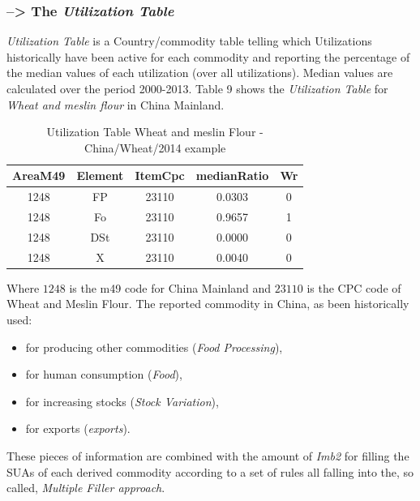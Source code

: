 \documentclass[]{article}
\providecommand{\tightlist}{%
  \setlength{\itemsep}{0pt}\setlength{\parskip}{0pt}}
\begin{document}
\subsubsection*{\texorpdfstring{--\textgreater{} The \emph{Utilization
Table}}{--\textgreater{} The Utilization Table}}\label{the-utilization-table}

\emph{Utilization Table} is a Country/commodity table telling which
Utilizations historically have been active for each commodity and
reporting the percentage of the median values of each utilization (over
all utilizations). Median values are calculated over the period
2000-2013. Table 9 shows the \emph{Utilization Table} for \emph{Wheat
and meslin flour} in China Mainland.

\begin{table}

\caption{\label{tab:t8}Utilization Table Wheat and meslin Flour - China/Wheat/2014 example}
\centering
\begin{tabular}[t]{c|c|c|c|c}
\hline
AreaM49 & Element & ItemCpc & medianRatio & Wr\\
\hline
1248 & FP & 23110 & 0.0303 & 0\\
\hline
1248 & Fo & 23110 & 0.9657 & 1\\
\hline
1248 & DSt & 23110 & 0.0000 & 0\\
\hline
1248 & X & 23110 & 0.0040 & 0\\
\hline
\end{tabular}
\end{table}

Where \(1248\) is the m49 code for China Mainland and \(23110\) is the
CPC code of Wheat and Meslin Flour. The reported commodity in China, as
been historically used:

\begin{itemize}
\tightlist
\item
  for producing other commodities (\emph{Food Processing}),
\item
  for human consumption (\emph{Food}),
\item
  for increasing stocks (\emph{Stock Variation}),
\item
  for exports (\emph{exports}).
\end{itemize}

These pieces of information are combined with the amount of \emph{Imb2}
for filling the SUAs of each derived commodity according to a set of
rules all falling into the, so called, \emph{Multiple Filler approach}.
\end{document}
